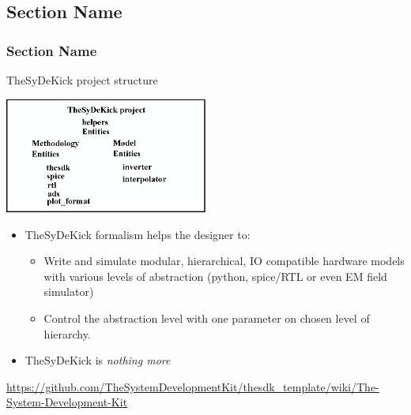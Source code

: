 \documentclass{sdkslides}
\newcommand{\sectname}{Section Name}
\begin{document}
\subsection*{\sectname}
\begin{frame}[t]
    \frametitle{\sectname}
    \begin{block}{TheSyDeKick project structure}
        \begin{center}
            \includegraphics[width=0.5\textwidth]{Pics/TheSyDeKick-entity-principles.eps}
        \end{center}
    \end{block}
    \begin{itemize}
       \item TheSyDeKick formalism helps the designer to: 
        \begin{itemize}
            \item Write and simulate modular, hierarchical, IO compatible
                hardware models with various levels of abstraction (python,
                spice/RTL or even EM field simulator)
            \item Control the abstraction level with one parameter on
                chosen level of hierarchy.
        \end{itemize}
        \item TheSyDeKick is \emph{nothing more}
    \end{itemize}
        {\tiny
        \url{https://github.com/TheSystemDevelopmentKit/thesdk_template/wiki/The-System-Development-Kit}}
\end{frame}


\renewcommand{\sectname}{How it is constructed?}
\end{document}
